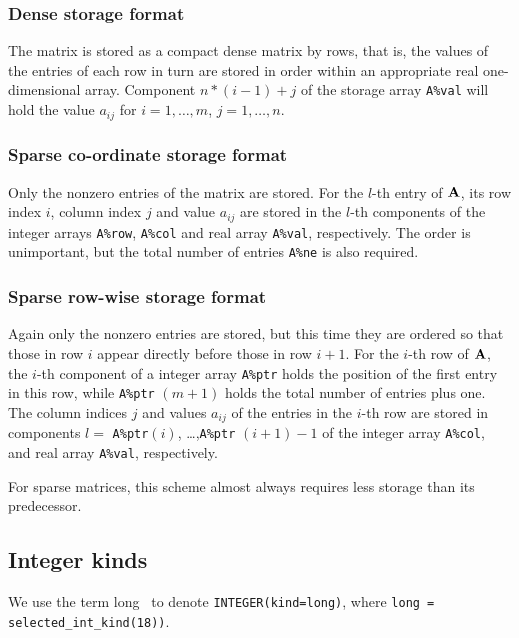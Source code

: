 \documentclass{galahad}
\begin{document}
\subsubsection{Dense storage format}\label{dense}
The matrix is stored as a compact 
dense matrix by rows, that is, the values of the entries of each row in turn are
stored in order within an appropriate real one-dimensional array.
Component $n \ast (i-1) + j$ of the storage array {\tt A\%val} will hold the 
value $a_{ij}$ for $i = 1, \ldots , m$, $j = 1, \ldots , n$.

\subsubsection{Sparse co-ordinate storage format}\label{coordinate}
Only the nonzero entries of the matrix are stored. For the 
$l$-th entry of ${\mathbf{A}}$, its row index $i$, column index $j$ 
and value $a_{ij}$
are stored in the $l$-th components of the integer arrays {\tt A\%row}, 
{\tt A\%col} and real array {\tt A\%val}, respectively.
The order is unimportant, but the total
number of entries {\tt A\%ne} is also required. 

\subsubsection{Sparse row-wise storage format}\label{rowwise}
Again only the nonzero entries are stored, but this time
they are ordered so that those in row $i$ appear directly before those
in row $i+1$. For the $i$-th row of ${\mathbf{A}}$, the $i$-th component of a 
integer array {\tt A\%ptr} holds the position of the first entry in this row,
while {\tt A\%ptr} $(m+1)$ holds the total number of entries plus one.
The column indices $j$ and values $a_{ij}$ of the entries in the $i$-th row 
are stored in components 
$l =$ {\tt A\%ptr}$(i)$, \ldots ,{\tt A\%ptr} $(i+1)-1$ of the 
integer array {\tt A\%col}, and real array {\tt A\%val}, respectively. 

For sparse matrices, this scheme almost always requires less storage than 
its predecessor.


\subsection{Integer kinds}\label{Integer kinds}
We use the term
long \integer\ to denote {\tt INTEGER\-(kind=long)}, where 
{\tt long = selected\_int\_kind(18))}.
\end{document}
